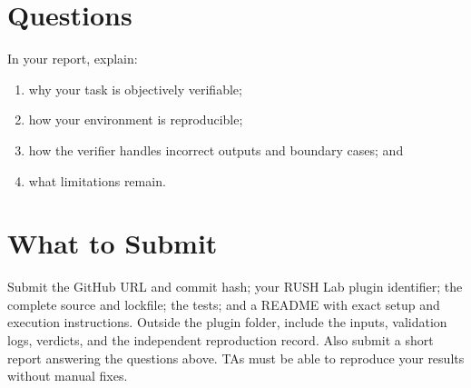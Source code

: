 \documentclass{article}
\begin{document}
\section{Questions}

In your report, explain:
\begin{enumerate}
  \item why your task is objectively verifiable;
  \item how your environment is reproducible;
  \item how the verifier handles incorrect outputs and boundary cases; and
  \item what limitations remain.
\end{enumerate}

\section{What to Submit}

Submit the GitHub URL and commit hash; your RUSH Lab plugin
identifier; the complete source and lockfile; the tests; and a README with
exact setup and execution instructions. Outside the plugin folder, include the
inputs, validation logs, verdicts, and the independent reproduction record.
Also submit a short report answering the questions above. TAs must be able to
reproduce your results without manual fixes.
\end{document}
